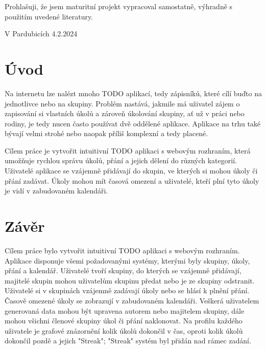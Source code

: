 \documentclass[a4paper,12pt]{report}
\begin{document}

\pagebreak
\vspace*{\fill}
Prohlašuji, že jsem maturitní projekt vypracoval samostatně, výhradně s použitím uvedené literatury.

V Pardubicích 4.2.2024

\pagebreak
\renewcommand{\contentsname}{\centering Obsah}
\tableofcontents
\pagebreak

\setcounter{page}{1}
\setcounter{section}{1}
\chapter{Úvod}
Na internetu lze nalézt mnoho TODO aplikací, tedy zápisníků, které cílí buďto na jednotlivce nebo na skupiny. Problém nastává, jakmile má uživatel zájem o zapisování si vlastních úkolů a zároveň úkolování skupiny, ať už v práci nebo rodiny, je tedy nucen často používat dvě oddělené aplikace. Aplikace na trhu také bývají velmi strohé nebo naopak příliš komplexní a tedy placené. 
\newline

Cílem práce je vytvořit intuitivní TODO aplikaci s webovým rozhraním, která umožňuje rychlou správu úkolů, přání a jejich dělení do různých kategorií. Uživatelé aplikace se vzájemně přidávají do skupin, ve kterých si mohou úkoly či přání zadávat. Úkoly mohou mít časová omezení a uživatelé, kteří plní tyto úkoly je vidí v zabudovaném kalendáři.





\chapter{Závěr}
Cílem práce bylo vytvořit intuitivní TODO aplikaci s webovým rozhraním. Aplikace disponuje všemi požadovanými systémy, kterými byly skupiny, úkoly, přání a kalendář. Uživatelé tvoří skupiny, do kterých se vzájemně přidávají, majitelé skupin mohou uživatelům skupinu předat nebo je ze skupiny odstranit. Uživatelé si v skupinách vzájemně zadávají úkoly nebo se hlásí k plnění přání. Časově omezené úkoly se zobrazují v zabudovaném kalendáři. Veškerá uživatelem generovaná data mohou být upravena autorem nebo majitelem skupiny, dále mohou všichni členové skupiny úkol či přání naklonovat. Na profilu každého uživatele je grafové znázornění kolik úkolů dokončil v čas, oproti kolik úkolů dokončil pozdě a jejich "Streak"; "Streak" systém byl přidán nad rámec zadání.
\end{document}
